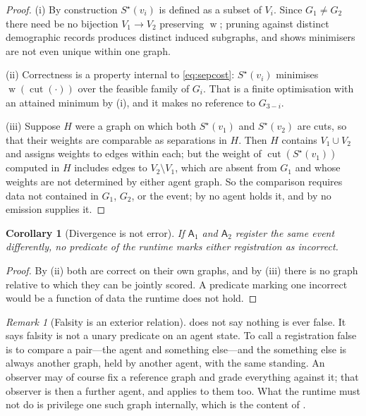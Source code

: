 \documentclass[11pt,a4paper]{article}
\theoremstyle{clstyle}
\newtheorem{corollary}[theorem]{Corollary}
\theoremstyle{definition}
\theoremstyle{remark}
\newtheorem{remark}[theorem]{Remark}
\DeclareMathOperator{\wt}{w}
\DeclareMathOperator{\cut}{cut}
\newcommand{\Ag}{\mathsf{A}}
\newcommand{\term}{v}                    %
\begin{document}
\begin{proof}
(i) By construction $S^{\star}(\term_i)$ is defined as a subset of $V_i$.
Since $G_1\neq G_2$ there need be no bijection $V_1\to V_2$ preserving
$\wt$; pruning against distinct demographic records produces distinct
induced subgraphs, and  shows minimisers are not even
unique within one graph.

(ii) Correctness is a property internal to \eqref{eq:sepcost}: $S^{\star}
(\term_i)$ minimises $\wt(\cut(\cdot))$ over the feasible family of $G_i$.
That is a finite optimisation with an attained minimum by
(i), and it makes no reference to $G_{3-i}$.

(iii) Suppose $H$ were a graph on which both $S^{\star}(\term_1)$ and
$S^{\star}(\term_2)$ are cuts, so that their weights are comparable as
separations in $H$. Then $H$ contains $V_1\cup V_2$ and assigns weights to
edges within each; but the weight of $\cut(S^{\star}(\term_1))$ computed in
$H$ includes edges to $V_2\setminus V_1$, which are absent from $G_1$ and
whose weights are not determined by either agent graph. So the comparison
requires data not contained in $G_1$, $G_2$, or the event; by
 no agent holds it, and by  no
emission supplies it.
\end{proof}

\begin{corollary}[Divergence is not error]
\label{cor:divergence}
If $\Ag_1$ and $\Ag_2$ register the same event differently, no predicate of
the runtime marks either registration as incorrect.
\end{corollary}

\begin{proof}
By (ii) both are correct on their own graphs, and by
(iii) there is no graph relative to which they can be jointly scored. A
predicate marking one incorrect would be a function of data the runtime does
not hold.
\end{proof}

\begin{remark}[Falsity is an exterior relation]
\label{rem:falsity}
 does not say nothing is ever false. It says falsity is
not a unary predicate on an agent state. To call a registration false is to
compare a pair---the agent and something else---and the something else is
always another graph, held by another agent, with the same standing. An
observer may of course fix a reference graph and grade everything against
it; that observer is then a further agent, and  applies
to them too. What the runtime must not do is privilege one such graph
internally, which is the content of .
\end{remark}
\end{document}
